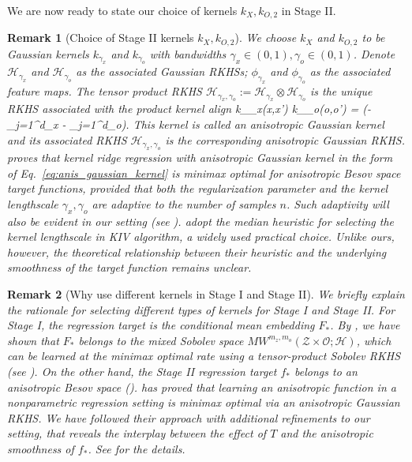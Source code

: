 \documentclass[11pt]{article}
\newenvironment{talign}
 {\let\displaystyle\textstyle\csname align\endcsname}
 {\endalign}
\newcommand{\bx}{\mathbf x}
\newcommand{\bo}{\mathbf o}
\newcommand{\calZ}{\mathcal{Z}}
\newcommand{\calH}{\mathcal{H}}
\newcommand{\calO}{\mathcal{O}}
\newcommand{\0}{\mathbf{0}}
\newtheorem{rem}{Remark}[section]
\begin{document}
We are now ready to state our choice of kernels $k_{X}, k_{O,2}$ in Stage II.
\begin{rem}[Choice of Stage II kernels $k_{X}, k_{O,2}$]\label{rem:kernel_stage_2_choice}
We choose $k_X$ and $k_{O,2}$ to be Gaussian kernels $k_{\gamma_x}$ and $k_{\gamma_o}$ with bandwidths $\gamma_x\in (0,1), \gamma_o\in (0,1)$.
Denote $\calH_{\gamma_x}$ and $\calH_{\gamma_o}$ as the associated Gaussian RKHSs; $\phi_{\gamma_x}$ and $\phi_{\gamma_o}$ as the associated feature maps. 
The tensor product RKHS $\calH_{\gamma_x,\gamma_o} := \calH_{\gamma_x} \otimes \calH_{\gamma_o}$ is the unique RKHS associated with the product kernel
\begin{talign}\label{eq:anis_gaussian_kernel}
    k_{\gamma_x}(\bx,\bx') \cdot k_{\gamma_o}(\bo,\bo') = \exp\left(-\sum_{j=1}^{d_x} - \sum_{j=1}^{d_o}\right).
\end{talign}
This kernel is called an anisotropic Gaussian kernel and its associated RKHS $\calH_{\gamma_x,\gamma_o}$ is the corresponding anisotropic Gaussian RKHS. 
\citet{hang2021optimal} proves that kernel ridge regression with anisotropic Gaussian kernel in the form of Eq.~\eqref{eq:anis_gaussian_kernel} is minimax optimal for anisotropic Besov space target functions, provided that both the regularization parameter and the kernel lengthscale $\gamma_x, \gamma_o$ are \emph{adaptive} to the number of samples $n$. 
Such adaptivity will also be evident in our setting (see ).
\citet{singh2019kernel} adopt the median heuristic for selecting the kernel lengthscale in KIV algorithm, a widely used practical choice. Unlike ours, however, the theoretical relationship between their heuristic and the underlying smoothness of the target function remains unclear.
\end{rem}



\begin{rem}[Why use different kernels in Stage I and Stage II]\label{rem:choice_kernel}
We briefly explain the rationale for selecting different types of kernels for Stage I and Stage II. 
For Stage I, the regression target is the conditional mean embedding $F_\ast$. By , we have shown that $F_{\ast}$ belongs to the mixed Sobolev space $MW^{m_z,m_o}(\calZ\times\calO;\calH)$, which can be learned at the minimax optimal rate using a tensor-product Sobolev RKHS (see ). 
On the other hand, the Stage II regression target $f_\ast$ belongs to an anisotropic Besov space ().
\citet{hang2021optimal} has proved that learning an anisotropic function in a nonparametric regression setting is minimax optimal via an anisotropic Gaussian RKHS. 
We have followed their approach with additional refinements to our setting, that reveals the interplay between the effect of $T$ and the anisotropic smoothness of $f_{\ast}$. See  for the details. 
\end{rem}
\end{document}
